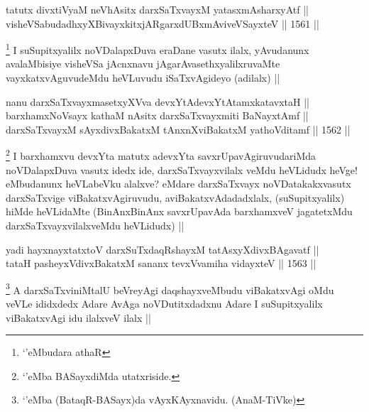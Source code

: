 
\begin{shl}
tatutx divxtiVyaM neVhAsitx darxSaTxvayxM yatasxmAsharxyAtf || \\
visheVSabudadhxyXBivayxkitxjARgarxdUBxmAviveVSayxteV ||  1561 ||  
\end{shl}

\begin{artha}
\footnote{`\stext'eMbudara athaR}
I suSupitxyalilx noVDalapxDuva eraDane vasutx ilalx, yAvudanunx avalaMbisiye visheVSa jAcnxnavu jAgarAvasethxyalilxruvaMte vayxkatxvAguvudeMdu heVLuvudu iSaTxvAgideyo (adilalx) ||
\end{artha}


\begin{shl}
nanu darxSaTxvayxmasetxyXVva devxYtAdevxYtAtamxkatavxtaH || \\
barxhamxNoV\s sayx kathaM nAsitx darxSaTxvayxmiti BaNayxtAmf || \\
darxSaTxvayxM sAyxdivxBakatxM tAnxnXviBakatxM yathoVditamf ||  1562 ||  
\end{shl}

\begin{artha}
\footnote{`\stext'eMba BASayxdiMda utatxriside.}
I barxhamxvu devxYta matutx adevxYta savxrUpavAgiruvudariMda noVDalapxDuva vasutx idedx ide, darxSaTxvayxvilalx veMdu heVLidudx heVge! eMbudanunx heVLabeVku alalxve? eMdare darxSaTxvayx noVDatakakxvasutx darxSaTxvige viBakatxvAgiruvudu, aviBakatxvAdadadxlalx, (suSupitxyalilx) hiMde heVLidaMte (BinAnxBinAnx savxrUpavAda barxhamxveV jagatetxMdu darxSaTxvayxvilalxveMdu heVLidudx) ||
\end{artha}

\begin{shl}
yadi hayxnayxtatxtoV darxSuTxdaqRshayxM tatAsxyXdivxBAgavatf ||  \\
tataH pasheyxVdivxBakatxM sananx tevxVvamiha vidayxteV ||  1563 ||  
\end{shl}

\begin{artha}
\footnote{`\stext'eMba (BataqR-BASayx)da vAyxKAyxnavidu. (AnaM-TiVke)}
A darxSaTxviniMtalU beVreyAgi daqshayxveMbudu viBakatxvAgi oMdu veVLe ididxdedx Adare AvAga noVDutitxdadxnu Adare I suSupitxyalilx viBakatxvAgi idu ilalxveV ilalx ||
\end{artha}

